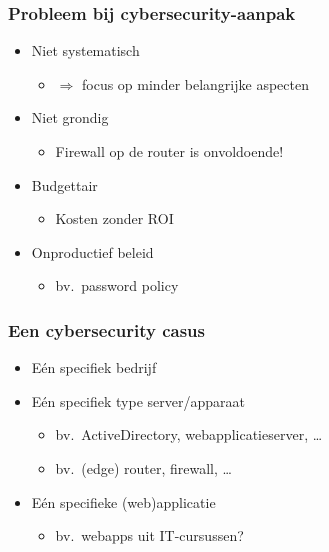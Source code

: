 \documentclass[aspectratio=169]{beamer}
\begin{document}
\begin{frame}
  \frametitle{Probleem bij cybersecurity-aanpak}

  \begin{itemize}
    \item Niet systematisch
          \begin{itemize}
            \item $\Rightarrow$ focus op minder belangrijke aspecten
          \end{itemize}
    \item Niet grondig
          \begin{itemize}
            \item Firewall op de router is onvoldoende!
          \end{itemize}
    \item Budgettair
          \begin{itemize}
            \item Kosten zonder ROI
          \end{itemize}
    \item Onproductief beleid
          \begin{itemize}
            \item bv.\ password policy
          \end{itemize}
  \end{itemize}

\end{frame}

\begin{frame}
  \frametitle{Een cybersecurity casus}

  \begin{itemize}
    \item Eén specifiek bedrijf
    \item Eén specifiek type server/apparaat
          \begin{itemize}
            \item bv.\ ActiveDirectory, webapplicatieserver, \ldots
            \item bv.\ (edge) router, firewall, \ldots
          \end{itemize}
    \item Eén specifieke (web)applicatie
          \begin{itemize}
            \item bv.\ webapps uit IT-cursussen?
          \end{itemize}
  \end{itemize}

\end{frame}
\end{document}
